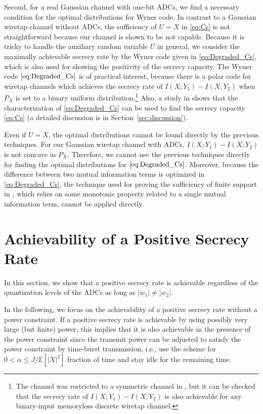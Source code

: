 \documentclass[journal]{IEEEtran}
\begin{document}
Second, for a real Gaussian channel with one-bit ADCs, we find a necessary condition for the optimal distributions for Wyner code. In contrast to a Gaussian wiretap channel without ADCs, the sufficiency of $U=X$ in \eqref{eq:Cs} is not straightforward because our channel is shown to be not capable.
Because it  is  tricky  to  handle  the auxiliary  random  variable $U$ in general, we consider the maximally achievable secrecy rate by the Wyner code given in \eqref{eq:Degraded_Cs}, which is also used for showing the positivity of the secrecy capacity. 
The Wyner code $\eqref{eq:Degraded_Cs}$ is of practical interest, because there is a polar code for wiretap channels \cite{MV11} which achieves the secrecy rate of $I(X;Y_1)-I(X;Y_2)$ when $P_X$ is set to a binary uniform  distribution.\footnote{The channel was restricted to a symmetric channel in \cite{MV11}, but it can be checked that the secrecy rate of $I(X;Y_1)-I(X;Y_2)$ is also achievable for any binary-input memoryless discrete wiretap channel.}
Also, a study in \cite{cyclic_symmetry} shows that the characterization of  \eqref{eq:Degraded_Cs} can be used to find the secrecy capacity \eqref{eq:Cs} (a detailed discussion is in Section~\ref{sec:discussion}).
    
Even if $U=X$, the optimal distributions cannot be found directly by the previous techniques. For our Gaussian wiretap channel with ADCs, $I(X;Y_1)-I(X;Y_2)$ is not concave in $P_X$. Therefore, we cannot use the previous techniques \cite{p2pADC} directly for finding the optimal distributions for $\eqref{eq:Degraded_Cs}$. Moreover, because the difference between two mutual information terms is optimized in \eqref{eq:Degraded_Cs}, the technique used for proving the sufficiency of finite support in \cite{p2pADC}, which relies on some monotonic property related to  a single mutual information term, cannot be applied directly.



\section{Achievability of a Positive Secrecy Rate} \label{sec:achievability}
In this section, we show that a positive secrecy rate is achievable regardless of the quantization levels of the ADCs as long as $|w_1| \neq |w_2|$. 

In the following, we focus on the achievability of a positive secrecy rate without a power constraint. If a positive secrecy rate is achievable by using possibly very large (but finite) power, this implies that it is also achievable in the presence of the power constraint since the transmit power can be adjusted to satisfy the power constraint by time-burst transmission, i.e., use the scheme for ${0< \alpha \leq J/\mathbb{E}[|X|^2]}$ fraction of time and stay idle for the remaining time. 
\end{document}
